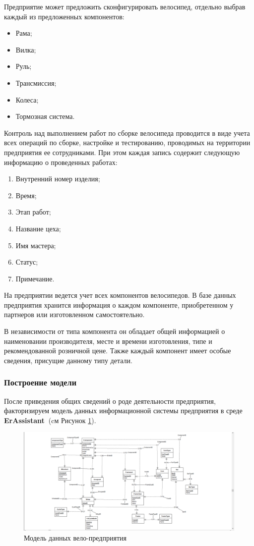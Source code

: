 \documentclass[a4paper,14pt]{extarticle}
\newcommand{\erassistant}{\textbf{ErAssistant~}}
\begin{document}
Предприятие может предложить сконфигурировать велосипед, отдельно выбрав каждый из предложенных компонентов:
\begin{itemize}
	\item Рама;
	\item Вилка;
	\item Руль;
	\item Трансмиссия;
	\item Колеса;
	\item Тормозная система.
\end{itemize}

Контроль над выполнением работ по сборке велосипеда проводится в виде учета всех операций по сборке, настройке и тестированию, проводимых на территории предприятия ее сотрудниками. При этом каждая запись содержит следующую информацию о проведенных работах:
\begin{enumerate}
	\item Внутренний номер изделия;
	\item Время;
	\item Этап работ;
	\item Название цеха;
	\item Имя мастера;
	\item Статус;
	\item Примечание.
\end{enumerate}

\newpage
На предприятии ведется учет всех компонентов велосипедов.
В базе данных предприятия хранится информация о каждом компоненте, приобретенном у партнеров или изготовленном самостоятельно.

 В независимости от типа компонента он обладает общей информацией о наименовании производителя, месте и времени изготовления, типе и рекомендованной розничной цене. 
Также каждый компонент имеет особые сведения, присущие данному типу детали.

\subsubsection*{Построение модели}
После приведения общих сведений о роде деятельности предприятия, факторизируем модель данных информационной системы предприятия в среде \erassistant (cм Рисунок \ref{fig:1-cycle}).
\begin{figure}[hpbt]
	\centering
	\includegraphics[width=1\linewidth]{images/1-cycle}
	\caption{Модель данных вело-предприятия}
	\label{fig:1-cycle}
\end{figure}
\end{document}
